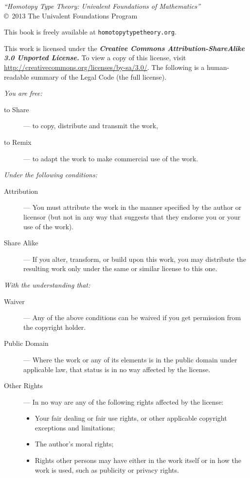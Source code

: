 {\footnotesize
\noindent
\emph{``Homotopy Type Theory: Univalent Foundations of Mathematics''}\\
\copyright\ 2013 The Univalent Foundations Program

\bigskip

\noindent
This book is freely available at
{\tt homotopytypetheory.org}.
%

\bigskip

\noindent
This work is licensed under the
\textbf{\emph{Creative Commons Attribution-ShareAlike 3.0 Unported License.}}
%
To view a copy of this license, visit
\href{http://creativecommons.org/licenses/by-sa/3.0/}{http://creativecommons.org/licenses/by-sa/3.0/}.
The following is a human-readable summary of the Legal Code (the full license).

\bigskip

\noindent
\emph{You are free:}
%
\begin{description}
\item[to Share] --- to copy, distribute and transmit the work,
\item[to Remix] --- to adapt the work to make commercial use of the work.
\end{description}
%
\emph{Under the following conditions:}
%
\begin{description}

\item[Attribution] --- You must attribute the work in the manner specified by the author
  or licensor (but not in any way that suggests that they endorse you or your use of the
  work).

\item[Share Alike] --- If you alter, transform, or build upon this work, you may
  distribute the resulting work only under the same or similar license to this one.
\end{description}
%
\emph{With the understanding that:}
\begin{description}

\item[Waiver] --- Any of the above conditions can be waived if you get permission from the
  copyright holder.

\item[Public Domain] --- Where the work or any of its elements is in the public domain
  under applicable law, that status is in no way affected by the license.

\item[Other Rights] --- In no way are any of the following rights affected by the license:
  \begin{itemize}
  \item Your fair dealing or fair use rights, or other applicable copyright exceptions and
    limitations;
  \item The author's moral rights;
  \item Rights other persons may have either in the work itself or in how the work is
    used, such as publicity or privacy rights.
  \end{itemize}
\end{description}

}
